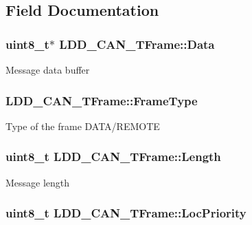 \subsection{Field Documentation}
\hypertarget{struct_l_d_d___c_a_n___t_frame_ab83c5354d715da8235b37699a4ad790d}{
\subsubsection[{Data}]{\setlength{\rightskip}{0pt plus 5cm}uint8\-\_\-t$\ast$ L\-D\-D\-\_\-\-C\-A\-N\-\_\-\-T\-Frame\-::\-Data}}\label{struct_l_d_d___c_a_n___t_frame_ab83c5354d715da8235b37699a4ad790d}
Message data buffer \hypertarget{struct_l_d_d___c_a_n___t_frame_aa46516e37548a263726db8a7319c9b2b}{
\subsubsection[{Frame\-Type}]{ L\-D\-D\-\_\-\-C\-A\-N\-\_\-\-T\-Frame\-::\-Frame\-Type}}\label{struct_l_d_d___c_a_n___t_frame_aa46516e37548a263726db8a7319c9b2b}
Type of the frame D\-A\-T\-A/\-R\-E\-M\-O\-T\-E \hypertarget{struct_l_d_d___c_a_n___t_frame_a04016da0d927a62cdcd7316590c3439e}{
\subsubsection[{Length}]{\setlength{\rightskip}{0pt plus 5cm}uint8\-\_\-t L\-D\-D\-\_\-\-C\-A\-N\-\_\-\-T\-Frame\-::\-Length}}\label{struct_l_d_d___c_a_n___t_frame_a04016da0d927a62cdcd7316590c3439e}
Message length \hypertarget{struct_l_d_d___c_a_n___t_frame_a4018fbfcb01a60be0b1b57413f103693}{
\subsubsection[{Loc\-Priority}]{\setlength{\rightskip}{0pt plus 5cm}uint8\-\_\-t L\-D\-D\-\_\-\-C\-A\-N\-\_\-\-T\-Frame\-::\-Loc\-Priority}}\label{struct_l_d_d___c_a_n___t_frame_a4018fbfcb01a60be0b1b57413f103693}
